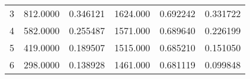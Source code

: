 \begin{tabular}{lrrrrr}
\multicolumn{1}{c}{3}&\multicolumn{1}{c}{812.0000}&\multicolumn{1}{c}{0.346121}&\multicolumn{1}{c}{1624.000}&\multicolumn{1}{c}{0.692242}&\multicolumn{1}{c}{0.331722}\\
\multicolumn{1}{c}{4}&\multicolumn{1}{c}{582.0000}&\multicolumn{1}{c}{0.255487}&\multicolumn{1}{c}{1571.000}&\multicolumn{1}{c}{0.689640}&\multicolumn{1}{c}{0.226199}\\
\multicolumn{1}{c}{5}&\multicolumn{1}{c}{419.0000}&\multicolumn{1}{c}{0.189507}&\multicolumn{1}{c}{1515.000}&\multicolumn{1}{c}{0.685210}&\multicolumn{1}{c}{0.151050}\\
\multicolumn{1}{c}{6}&\multicolumn{1}{c}{298.0000}&\multicolumn{1}{c}{0.138928}&\multicolumn{1}{c}{1461.000}&\multicolumn{1}{c}{0.681119}&\multicolumn{1}{c}{0.099848}\\
\bottomrule
\end{tabular}
